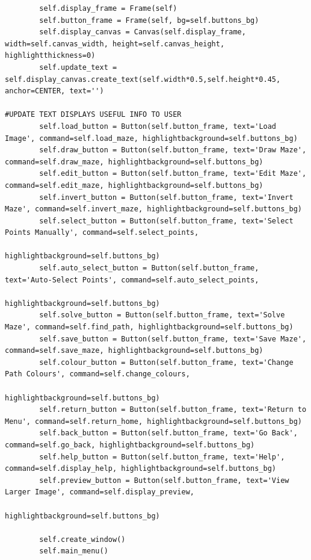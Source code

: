 \documentclass[titlepage]{article}
\begin{document}
\begin{changemargin}{-1in}{-1in}
\begin{verbatim}
        self.display_frame = Frame(self)
        self.button_frame = Frame(self, bg=self.buttons_bg)
        self.display_canvas = Canvas(self.display_frame, width=self.canvas_width, height=self.canvas_height, highlightthickness=0)
        self.update_text = self.display_canvas.create_text(self.width*0.5,self.height*0.45, anchor=CENTER, text='')
                                                                                #UPDATE TEXT DISPLAYS USEFUL INFO TO USER
        self.load_button = Button(self.button_frame, text='Load Image', command=self.load_maze, highlightbackground=self.buttons_bg)
        self.draw_button = Button(self.button_frame, text='Draw Maze', command=self.draw_maze, highlightbackground=self.buttons_bg)
        self.edit_button = Button(self.button_frame, text='Edit Maze', command=self.edit_maze, highlightbackground=self.buttons_bg)
        self.invert_button = Button(self.button_frame, text='Invert Maze', command=self.invert_maze, highlightbackground=self.buttons_bg)
        self.select_button = Button(self.button_frame, text='Select Points Manually', command=self.select_points,
                                    highlightbackground=self.buttons_bg)
        self.auto_select_button = Button(self.button_frame, text='Auto-Select Points', command=self.auto_select_points,
                                         highlightbackground=self.buttons_bg)
        self.solve_button = Button(self.button_frame, text='Solve Maze', command=self.find_path, highlightbackground=self.buttons_bg)
        self.save_button = Button(self.button_frame, text='Save Maze', command=self.save_maze, highlightbackground=self.buttons_bg)
        self.colour_button = Button(self.button_frame, text='Change Path Colours', command=self.change_colours,
                                    highlightbackground=self.buttons_bg)
        self.return_button = Button(self.button_frame, text='Return to Menu', command=self.return_home, highlightbackground=self.buttons_bg)
        self.back_button = Button(self.button_frame, text='Go Back', command=self.go_back, highlightbackground=self.buttons_bg)
        self.help_button = Button(self.button_frame, text='Help', command=self.display_help, highlightbackground=self.buttons_bg)
        self.preview_button = Button(self.button_frame, text='View Larger Image', command=self.display_preview,
                                     highlightbackground=self.buttons_bg)

        self.create_window()
        self.main_menu()


\end{verbatim}
\end{changemargin}
\end{document}

